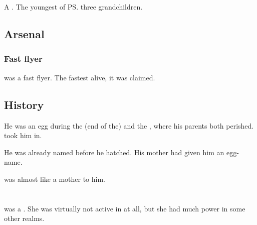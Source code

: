 \section{\Rathyon}
\index{\Rathyon}
A \dragon. 
The youngest of \ps{\QuessanthIshnaruchaefir} three grandchildren. 









\subsection{Arsenal}
\subsubsection{Fast flyer}
\Rathyon{} was a fast flyer. 
The fastest \dragon{} alive, it was claimed. 









\subsection{History}
He was an egg during the (end of the) \Secondbanewar{} and the \SecondShrouding{}, where his parents both perished. 
\Ishnaruchaefir{} took him in. 

He was already named before he hatched. 
His mother had given him an egg-name. 

\Criseis{} was almost like a mother to him. 















\section{\Skelcurmaggra}
\index{\Skelcurmaggra}
\Skelcurmaggra was a \dragon. 
She was virtually not active in \Azmith at all, but she had much power in some other realms. 

















